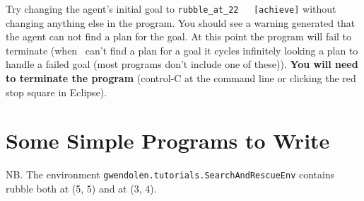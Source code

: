 Try changing the agent's initial goal to \lstinline{rubble_at_22
  [achieve]} without changing anything else in the program.  You
should see a warning generated that the agent can not find a plan for
the goal.  At this point the program will
fail to
terminate (when \gwendolen\ can't find a
plan for a goal it cycles infinitely looking a plan to handle a failed
goal (most programs don't include one of these)).  {\bf You will need
  to terminate the program} (control-C at the command line or clicking
the red stop square in
Eclipse). 

\section{Some Simple Programs to Write}
\label{ex:tutorial3}
NB.  The environment
\texttt{gwendolen.tutorials.SearchAndRescueEnv} contains rubble both at (5, 5) and at (3, 4). 

